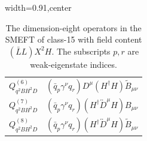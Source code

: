 \begin{table}[H]
\begin{center}
\begin{adjustbox}{width=0.91\textwidth,center}
\begin{minipage}[t]{6.3cm}
\begin{tabular}[t]{c|c}
%
$Q_{q^2BH^2D}^{(6)}$  &  $(\bar{q}_p \gamma^\nu q_r) D^{\mu} (H^\dag H) \widetilde B_{\mu\nu}$ \\
%
$Q_{q^2BH^2D}^{(7)}$  &  $(\bar{q}_p \gamma^\nu q_r) (H^\dag \overleftrightarrow{D}^\mu H) B_{\mu\nu}$ \\
%
$Q_{q^2BH^2D}^{(8)}$  &  $(\bar{q}_p \gamma^\nu q_r) (H^\dag \overleftrightarrow{D}^\mu H) \widetilde B_{\mu\nu}$ \\
%
\end{tabular}
\end{minipage}
\end{adjustbox}
\end{center}
\caption{The dimension-eight operators in the SMEFT of class-15 with field content $(\bar L L)X^2H$. The subscripts $p, r$ are weak-eigenstate indices.}
\label{tab:smeft8class_15LL}
\end{table}
